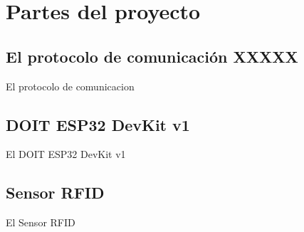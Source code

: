 \documentclass[../main.tex]{subfiles}
\begin{document}
\section{Partes del proyecto}
\subsection{El protocolo de comunicación XXXXX}
El protocolo de comunicacion

\subsection{DOIT ESP32 DevKit v1}
El DOIT ESP32 DevKit v1

\subsection{Sensor RFID}
El Sensor RFID
\end{document}

